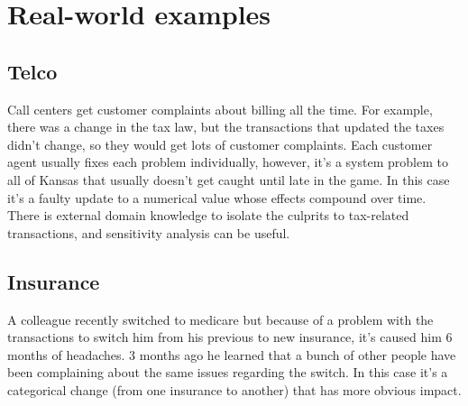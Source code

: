 
\section{Real-world examples}
\label{s:usecase}


\subsection{Telco}

Call centers get customer complaints about billing all the time.
For example, there was a change in the tax law, but the transactions
that updated the taxes didn't change, so they would get lots of
customer complaints.  Each customer agent usually fixes each problem
individually, however, it's a system problem to all of Kansas that
usually doesn't get caught until late in the game.  In this case
it's a faulty update to a numerical value whose effects compound
over time.  There is external domain knowledge to isolate the
culprits to tax-related transactions, and sensitivity analysis can
be useful.

\subsection{Insurance}

A colleague recently switched to medicare but because of a problem
with the transactions to switch him from his previous to new
insurance, it's caused him 6 months of headaches.  3 months ago he
learned that a bunch of other people have been complaining about
the same issues regarding the switch.  In this case it's a categorical
change (from one insurance to another) that has more obvious impact.


